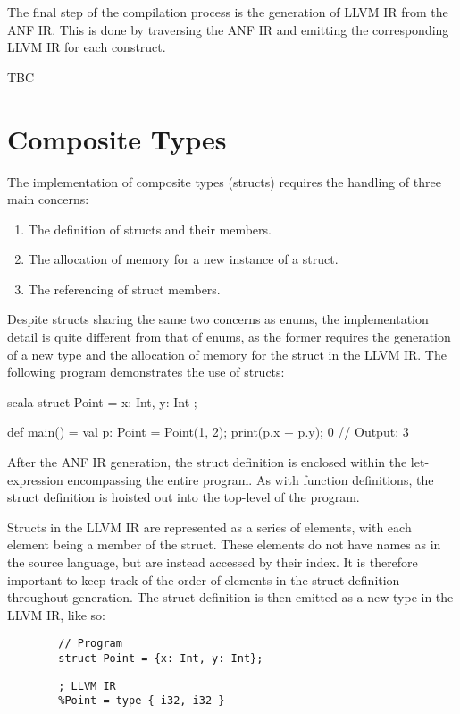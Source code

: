 The final step of the compilation process is the generation of LLVM IR from the ANF IR\@. This is
done by traversing the ANF IR and emitting the corresponding LLVM IR for each construct.

TBC

\section{Composite Types}

The implementation of composite types (structs) requires the handling of three main concerns:

\begin{enumerate}
    \singlespacing
    \item The definition of structs and their members.
    \item The allocation of memory for a new instance of a struct.
    \item The referencing of struct members.
\end{enumerate}

Despite structs sharing the same two concerns as enums, the implementation detail is quite different
from that of enums, as the former requires the generation of a new type and the allocation of memory
for the struct in the LLVM IR\@. The following program demonstrates the use of structs:

\begin{code}{scala}
    struct Point = {
        x: Int,
        y: Int
    };

    def main() = {
        val p: Point = Point(1, 2);
        print(p.x + p.y);
        0
    }
    // Output: 3
\end{code}

After the ANF IR generation, the struct definition is enclosed within the let-expression
encompassing the entire program. As with function definitions, the struct definition is hoisted out
into the top-level of the program.

Structs in the LLVM IR are represented as a series of elements, with each element being a member of
the struct. These elements do not have names as in the source language, but are instead accessed by
their index. It is therefore important to keep track of the order of elements in the struct
definition throughout generation. The struct definition is then emitted as a new type in the LLVM
IR\@, like so:

\begin{tcolorbox}[sidebyside]
    \begin{verbatim}
        // Program
        struct Point = {x: Int, y: Int};
    \end{verbatim}
    \tcblower
    \begin{verbatim}
        ; LLVM IR
        %Point = type { i32, i32 }
    \end{verbatim}
\end{tcolorbox}

